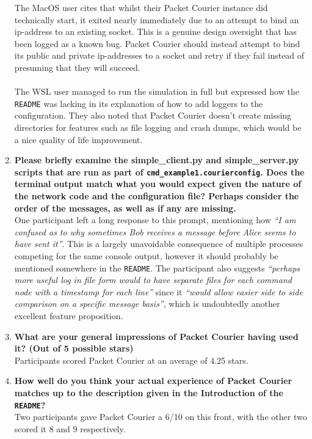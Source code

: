 \begin{enumerate}
    The MacOS user cites that whilst their Packet Courier instance did technically start, it exited nearly
    immediately due to an attempt to bind an ip-address to an existing socket. This is a genuine design oversight
    that has been logged as a known bug. Packet Courier should instead attempt to bind its public and private
    ip-addresses to a socket and retry if they fail instead of presuming that they will succeed. \\ \\
    The WSL user managed to run the simulation in full but expressed how the \texttt{README} was lacking in its
    explanation of how to add loggers to the configuration. They also noted that Packet Courier doesn't create
    missing directories for features such as file logging and crash dumps, which would be a nice quality of life
    improvement.
    \item \textbf{Please briefly examine the simple\_client.py and simple\_server.py scripts that are run as part of
    \texttt{cmd\_example1.courierconfig}. Does the terminal output match what you would expect given the nature of
    the network code and the configuration file? Perhaps consider the order of the messages, as well as if any are
    missing.} \\
    One participant left a long response to this prompt, mentioning how \emph{``I am confused as to why sometimes Bob
    receives a message before Alice seems to have sent it''}. This is a largely unavoidable consequence of multiple
    processes competing for the same console output, however it should probably be mentioned somewhere in the
    \texttt{README}. The participant also suggests \emph{``perhaps more useful log in file form would to have
    separate files for each command node with a timestamp for each line''} since it \emph{``would allow easier side
    to side comparison on a specific message basis''}, which is undoubtedly another excellent feature proposition.
    \item \textbf{What are your general impressions of Packet Courier having used it? (Out of 5 possible stars)} \\
    Participants scored Packet Courier at an average of 4.25 stars.
    \item \textbf{How well do you think your actual experience of Packet Courier matches up to the description given
    in the Introduction of the \texttt{README}?} \\
    Two participants gave Packet Courier a 6/10 on this front, with the other two scored it 8 and 9 respectively.

\end{enumerate}
